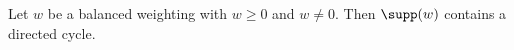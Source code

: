 \begin{lemma}[Support]\label{sh-0406}
Let $w$ be a balanced weighting with $w \geq 0$ and $w \neq 0$. Then $\supp(w)$ contains a directed cycle.
\end{lemma}